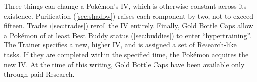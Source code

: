 Three things can change a Pokémon's IV, which is otherwise constant across its existence.
Purification (\autoref{sec:shadow}) raises each component by two, not to exceed fifteen.
Trades (\autoref{sec:trades}) reroll the IV entirely.
Finally, Gold Bottle Caps allow a Pokémon of at least Best Buddy status (\autoref{sec:buddies}) 
  to enter ``hypertraining''.
The Trainer specifies a new, higher IV, and is assigned a set of Research-like tasks.
If they are completed within the specified time, the Pokémon acquires the new IV.
At the time of this writing, Gold Bottle Caps have been available only through paid Research.

